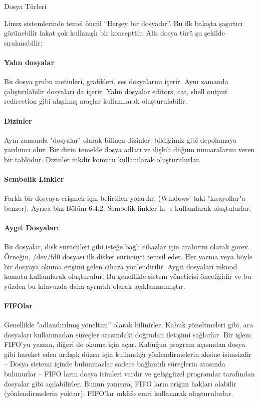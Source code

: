 \begin{section}{Dosya Türleri}

Linux sistemlerinde temel öncül “Herşey bir dosyadır”. Bu ilk bakışta şaşırtıcı
görünebilir fakat çok kullanışlı bir konsepttir. Altı dosya türü şu şekilde sıralanabilir:
\paragraph{Yalın dosyalar}{Bu dosya grubu metinleri, grafikleri, ses dosyalarını içerir. Aynı zamanda çalıştırılabilir dosyaları da içerir. Yalın dosyalar editors, cat, shell output redirection gibi alışılmış araçlar kullanılarak oluşturulabilir.}
\paragraph{Dizinler}{Aynı zamanda "dosyalar" olarak bilinen dizinler, bildiğimiz gibi depolamaya yardımcı olur. Bir dizin temelde dosya adları ve ilişkili düğüm numaralarını veren bir tablodur. Dizinler mkdir komutu kullanılarak oluşturulurlar.}
\paragraph{Sembolik Linkler}{ Farklı bir dosyaya erişmek için belirtilen yolardır. (Windows' taki "kısayollar"a benzer). Ayrıca bkz Bölüm 6.4.2. Sembolik linkler ln -s kullanılarak oluştulurlar.}
\paragraph{Aygıt Dosyaları}{Bu dosyalar, disk sürücüleri gibi isteğe bağlı cihazlar için arabirim olarak görev. Örneğin, /dev/fd0 dosyası ilk disket sürücüyü temsil eder. Her yazma veya böyle bir dosyaya okuma erişimi gelen cihaza yönlendirilir. Aygıt dosyaları mknod komutu kullanılarak oluşturulur; Bu genellikle sistem yöneticisi önceliğidir ve bu yüzden bu kılavuzda daha ayrıntılı olarak açıklanmamıştır.}
\paragraph{FIFOlar}{Genellikle "adlandırılmış yöneltim” olarak bilinirler. Kabuk yöneltmeleri gibi, ara dosyaları kullanmadan süreçler arasındaki doğrudan iletişimi sağlarlar. Bir işlem FIFO'yu yazma, diğeri de okuma için açar. Kabuğun program açısından dosya gibi hareket eden ardışık düzen için kullandığı yönlendirmelerin aksine isimsizdir -- Dosya sistemi içinde bulunmazlar sadece bağlantılı süreçlerin arasında bulunurlar -- FIFO ların dosya isimleri vardır ve gelişigüzel programlar tarafından dosyalar gibi açılabilirler. Bunun yanısıra, FIFO ların erişim hakları olabilir (yönlendirmelerin yoktur). FIFO'lar mkfifo emri kullanarak oluşturulurlar.}

\end{section}
